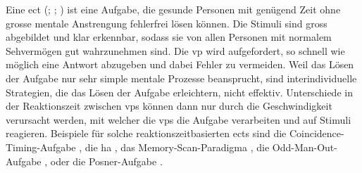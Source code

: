 \documentclass[11pt, twoside, a4paper]{book}		%
\begin{document}
Eine \gls{ect} (\citealp[S. 290]{Anderson2001}; \citealp[S. 11]{Carroll1993}; \citealp[S. 207--209]{Jensen2006}) ist eine Aufgabe, die gesunde Personen mit genügend Zeit ohne grosse mentale Anstrengung fehlerfrei lösen können. Die Stimuli sind gross abgebildet und klar erkennbar, sodass sie von allen Personen mit normalem Sehvermögen gut wahrzunehmen sind. Die \gls{vp} wird aufgefordert, so schnell wie möglich eine Antwort abzugeben und dabei Fehler zu vermeiden. Weil das Lösen der Aufgabe nur sehr simple mentale Prozesse beansprucht, sind interindividuelle Strategien, die das Lösen der Aufgabe erleichtern, nicht effektiv. Unterschiede in der Reaktionszeit zwischen \glspl{vp} können dann nur durch die Geschwindigkeit verursacht werden, mit welcher die \glspl{vp} die Aufgabe verarbeiten und auf Stimuli reagieren.
Beispiele für solche reaktionszeitbasierten \glspl{ect} sind
die Coincidence-Timing-Aufgabe \citep[bei welcher eine zeitliches Zusammentreffen von zwei Stimuli so rasch als möglich erkannt werden muss;][]{Smith1987}, 
die \gls{ha} \citep[zur Erfassung einfacher Reaktionszeit und der Reaktionszeit für eine Mehrfachauswahl;][]{Hick1952}, 
das Memory-Scan-Paradigma \citep[zur Erfassung der benötigten Zeit für einen Zugriff auf das Kurzzeitgedächtnis;][]{Sternberg1966, Sternberg1969},
die Odd-Man-Out-Aufgabe \citep[zur Erfassung der Reaktionszeit für eine Mehrfachauswahl;][]{Frearson1986}, 
oder die Posner-Aufgabe \citep[zur Erfassung der benötigten Zeit für einen Zugriff auf das Langzeitgedächtnis;][]{Posner1969}.

\end{document}
